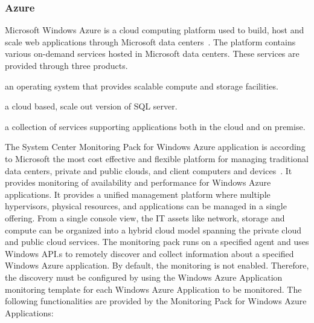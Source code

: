 \documentclass{sig-alternate-05-2015}
\begin{document}
\subsubsection{Azure}

Microsoft Windows Azure is a cloud computing platform used to build,
host and scale web applications through Microsoft data
centers~\cite{azure11}. The platform contains various on-demand
services hosted in Microsoft data centers. These services are provided
through three products.

\begin{description}
\setlength\itemsep{-2pt} 

\item[\it Windows Azure:] an operating system that provides scalable
  compute and storage facilities.

 \item[\it SQL Azure:] a cloud based, scale out version of SQL server.

 \item[\it Windows Azure AppFabric:] a collection of services
   supporting applications both in the cloud and on premise.

\end{description}

The System Center Monitoring Pack for Windows Azure application is
according to Microsoft the most cost effective and flexible platform
for managing traditional data centers, private and public clouds, and
client computers and devices~\cite{MonitoringPackAzure11}. It provides
monitoring of availability and performance for Windows Azure
applications. It provides a unified management platform where multiple
hypervisors, physical resources, and applications can be managed in a
single offering. From a single console view, the IT assets like
network, storage and compute can be organized into a hybrid cloud
model spanning the private cloud and public cloud services. The
monitoring pack runs on a specified agent and uses Windows API.s to
remotely discover and collect information about a specified Windows
Azure application. By default, the monitoring is not
enabled. Therefore, the discovery must be configured by using the
Windows Azure Application monitoring template for each Windows Azure
Application to be monitored. The following functionalities are
provided by the Monitoring Pack for Windows Azure Applications:
\end{document}
